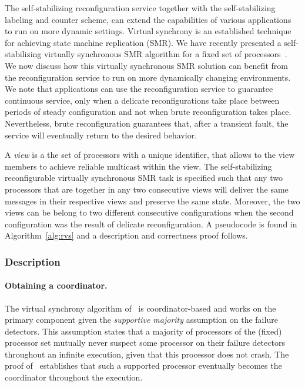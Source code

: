 \documentclass[11pt]{article}
\begin{document}
The self-stabilizing reconfiguration service together with the self-stabilizing labeling and counter scheme, can extend the capabilities of various applications to run on more dynamic settings.
Virtual synchrony is an established technique for achieving state machine replication (SMR).
We have recently presented a self-stabilizing virtually synchronous SMR algorithm for a fixed set of processors~\cite{SSVS}.
We now discuss how this virtually synchronous SMR solution can benefit from the reconfiguration service to run on more dynamically changing environments.
We note that applications can use the reconfiguration service to guarantee continuous service, only when a delicate reconfigurations take place between periods of steady configuration and not when brute reconfiguration takes place. 
Nevertheless, brute reconfiguration guarantees that, after a transient fault, the service will eventually return to the desired behavior. 

A \emph{view} is a the set of processors with a unique identifier, that allows to the view members to achieve reliable multicast within the view.
The self-stabilizing reconfigurable virtually synchronous SMR task is specified such that any two processors that are together in any two consecutive views will deliver the same messages in their respective views and preserve the same state.
Moreover, the two views can be belong to two different consecutive configurations when the second configuration was the result of delicate reconfiguration. 
A pseudocode is found in Algorithm~\ref{alg:rvs} and a description and correctness proof follows.

\subsubsection{Description} 

\paragraph{Obtaining a coordinator.}
The virtual synchrony algorithm of~\cite{SSVS} is coordinator-based and works on the primary component given the \emph{supportive majority} assumption on the failure detectors.
This assumption states that a majority of processors of the (fixed) processor set mutually never suspect some processor on their failure detectors throughout an infinite execution, given that this processor does not crash.
The proof of~\cite{SSVS} establishes that such a supported processor eventually becomes the coordinator throughout the execution.
\end{document}
